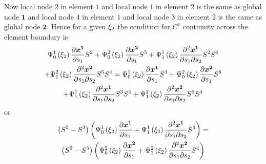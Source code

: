 Now local node $2$ in element $\mathit{1}$ and local node $1$ in element
$\mathit{2}$ is the same as global node $\mathbf{1}$ and local node $4$ in
element $\mathit{1}$ and local node $3$ in element $\mathit{2}$ is the same as
global node $\mathbf{2}$. Hence for a given $\xi_{2}$ the condition for $C^{1}$
continuity across the element boundary is
\begin{multline}
  \chbfn{0}{1}{\xitwo}\delby{\nodept{\vect{x}}{\mathbf{1}}}{s_{1}}\esfone{2}+
  \chbfn{0}{2}{\xitwo}\delby{\nodept{\vect{x}}{\mathbf{2}}}{s_{1}}\esfone{5}+ 
  \chbfn{1}{1}{\xitwo}\deltwoby{\nodept{\vect{x}}{\mathbf{1}}}{s_{1}}{s_{2}}
  \esfone{2}\esfone{4} \\
  +\chbfn{1}{2}{\xitwo}\deltwoby{\nodept{\vect{x}}{\mathbf{2}}}{s_{1}}{s_{2}}
  \esfone{5}\esfone{4} = \chbfn{0}{1}{\xitwo}\delby{\nodept{\vect{x}}
    {\mathbf{1}}}{s_{1}}\esfone{3}+\chbfn{0}{2}{\xitwo}\delby{\nodept{\vect{x}}
    {\mathbf{2}}}{s_{1}}\esfone{6} \\
  +\chbfn{1}{1}{\xitwo}\deltwoby{\nodept{\vect{x}}{\mathbf{1}}}{s_{1}}{s_{2}}
  \esfone{3}\esfone{4}+\chbfn{1}{2}{\xitwo}\deltwoby{\nodept{\vect{x}}
    {\mathbf{2}}}{s_{1}}{s_{2}}\esfone{6}\esfone{4}
\end{multline}
or
\begin{multline}
  \pbrac{\esfone{2}-\esfone{3}}\pbrac{\chbfn{0}{1}{\xitwo}
    \delby{\nodept{\vect{x}}{\mathbf{1}}}{s_{1}}+\chbfn{1}{1}{\xitwo}
    \deltwoby{\nodept{\vect{x}}{\mathbf{1}}}{s_{1}}{s_{2}}\esfone{4}} = \\
  \pbrac{\esfone{6}-\esfone{5}}\pbrac{\chbfn{0}{2}{\xitwo}
    \delby{\nodept{\vect{x}}{\mathbf{2}}}{s_{1}}+\chbfn{1}{2}{\xitwo}
    \deltwoby{\nodept{\vect{x}}{\mathbf{2}}}{s_{1}}{s_{2}}\esfone{4}}
  \label{eqn:bchc1condition}
\end{multline}


